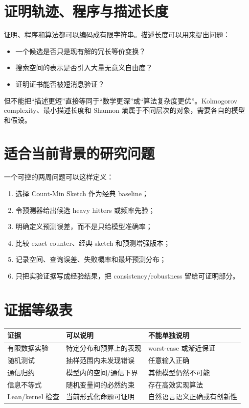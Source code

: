 \section{证明轨迹、程序与描述长度}

证明、程序和算法都可以编码成有限字符串。描述长度可以用来提出问题：
\begin{itemize}
  \item 一个候选是否只是现有解的冗长等价变换？
  \item 搜索空间的表示是否引入大量无意义自由度？
  \item 证明证书能否被短消息验证？
\end{itemize}
但不能把“描述更短”直接等同于“数学更深”或“算法复杂度更优”。Kolmogorov complexity、最小描述长度和 Shannon 熵属于不同层次的对象，需要各自的模型和假设。

\section{适合当前背景的研究问题}

\begin{aibox}
一个可控的两周问题可以这样定义：
\begin{enumerate}
  \item 选择 Count-Min Sketch 作为经典 baseline；
  \item 令预测器给出候选 heavy hitters 或频率先验；
  \item 明确定义预测误差，而不是只给模型准确率；
  \item 比较 exact counter、经典 sketch 和预测增强版本；
  \item 记录空间、查询误差、失败概率和最坏预测分布；
  \item 只把实验证据写成经验结果，把 consistency/robustness 留给可证明部分。
\end{enumerate}
\end{aibox}

\section{证据等级表}

\begin{center}
\begin{tabularx}{\textwidth}{lXX}
\toprule
证据 & 可以说明 & 不能单独说明\\
\midrule
有限数据实验 & 特定分布和预算上的表现 & worst-case 或渐近保证\\
随机测试 & 抽样范围内未发现错误 & 任意输入正确\\
通信归约 & 模型内的空间/通信下界 & 其他模型仍然不可能\\
信息不等式 & 随机变量间的必然约束 & 存在高效实现算法\\
Lean/kernel 检查 & 当前形式化命题可证明 & 自然语言语义正确或有创新性\\
\bottomrule
\end{tabularx}
\end{center}

